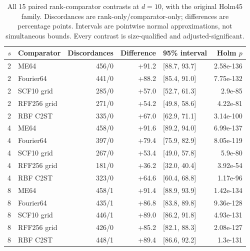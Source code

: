 \begin{table}[t]\centering\scriptsize
\caption{All 15 paired rank-comparator contrasts at $d=10$, with the original Holm45 family. Discordances are rank-only/comparator-only; differences are percentage points. Intervals are pointwise normal approximations, not simultaneous bounds. Every contrast is size-qualified and adjusted-significant.}
\label{tab:axis-paired-d10}
{\setlength{\tabcolsep}{8pt}\renewcommand{\arraystretch}{1.2}
\begin{tabular}{rlrrlr}
\toprule
$s$ & Comparator & Discordances & Difference & 95\% interval & Holm $p$\\
\midrule
2 & ME64 & 456/0 & +91.2 & [88.7, 93.7] & 2.58e-136\\
2 & Fourier64 & 441/0 & +88.2 & [85.4, 91.0] & 7.75e-132\\
2 & SCF10 grid & 285/0 & +57.0 & [52.7, 61.3] & 2.9e-85\\
2 & RFF256 grid & 271/0 & +54.2 & [49.8, 58.6] & 4.22e-81\\
2 & RBF C2ST & 335/0 & +67.0 & [62.9, 71.1] & 3.14e-100\\
4 & ME64 & 458/0 & +91.6 & [89.2, 94.0] & 6.99e-137\\
4 & Fourier64 & 397/0 & +79.4 & [75.9, 82.9] & 8.05e-119\\
4 & SCF10 grid & 267/0 & +53.4 & [49.0, 57.8] & 5.9e-80\\
4 & RFF256 grid & 181/0 & +36.2 & [32.0, 40.4] & 3.92e-54\\
4 & RBF C2ST & 323/0 & +64.6 & [60.4, 68.8] & 1.17e-96\\
8 & ME64 & 458/1 & +91.4 & [88.9, 93.9] & 1.42e-134\\
8 & Fourier64 & 435/1 & +86.8 & [83.8, 89.8] & 9.36e-128\\
8 & SCF10 grid & 446/1 & +89.0 & [86.2, 91.8] & 4.93e-131\\
8 & RFF256 grid & 426/0 & +85.2 & [82.1, 88.3] & 2.08e-127\\
8 & RBF C2ST & 448/1 & +89.4 & [86.6, 92.2] & 1.3e-131\\
\bottomrule
\end{tabular}}
\end{table}

